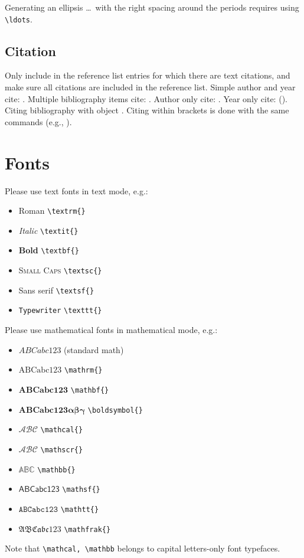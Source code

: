 \documentclass[rbe,fleqn]{econbr}
\begin{document}
Generating an ellipsis \ldots\ with the right spacing around the periods requires using \verb|\ldots|.

\subsection{Citation}
Only include in the reference list entries for which there are text citations, and make sure all citations are included in the reference list. Simple author and year cite: \citet{Engle1987}. Multiple bibliography items cite: \citet{Dahlquist2004,Hendry2001,Pesaran1998}. Author only cite: \citeauthor{Dahlquist2004}. Year only cite: (\citeyear{Pesaran1998}). Citing bibliography with object \citet[Theorem 1]{Engle1987}. Citing within brackets is done with the same commands (e.g., \citet{Dahlquist2004,Hendry2001}).

\section{Fonts}
Please use text fonts in text mode, e.g.:
\begin{itemize}
\item[]\textrm{Roman} \verb|\textrm{}|
\item[]\textit{Italic} \verb|\textit{}|
\item[]\textbf{Bold} \verb|\textbf{}|
\item[]\textsc{Small Caps} \verb|\textsc{}|
\item[]\textsf{Sans serif} \verb|\textsf{}|
\item[]\texttt{Typewriter} \verb|\texttt{}|
\end{itemize}
Please use mathematical fonts in mathematical mode, e.g.:
\begin{itemize}
\item[] $ABCabc123$ (standard math)
\item[] $\mathrm{ABCabc123}$ \verb|\mathrm{}|
\item[] $\mathbf{ABCabc123}$ \verb|\mathbf{}|
\item[] $\boldsymbol{ABCabc123\alpha\beta\gamma}$ \verb|\boldsymbol{}|
\item[] $\mathcal{ABC}$ \verb|\mathcal{}|
\item[] $\mathscr{ABC}$ \verb|\mathscr{}|
\item[] $\mathbb{ABC}$ \verb|\mathbb{}|
\item[] $\mathsf{ABCabc123}$ \verb|\mathsf{}| 
\item[] $\mathtt{ABCabc123}$ \verb|\mathtt{}|
\item[] $\mathfrak{ABCabc123}$ \verb|\mathfrak{}|
\end{itemize}
Note that \verb|\mathcal, \mathbb| belongs to capital letters-only font typefaces.
\end{document}
